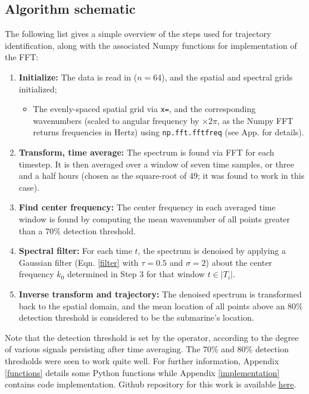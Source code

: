 \documentclass{article}
\begin{document}
\subsection{Algorithm schematic}
The following list gives a simple overview of the steps used for trajectory identification, along with the associated Numpy functions for implementation of the FFT:
\begin{enumerate}
\item \textbf{Initialize:} The data is read in ($n=64$), and the spatial and spectral grids initialized;
  \begin{itemize}
  \item The evenly-spaced spatial grid via \texttt{x=}, and the corresponding wavenumbers (scaled to angular frequency by $\times 2\pi$, as the Numpy FFT returns frequencies in Hertz) using \texttt{np.fft.fftfreq} (see App.  for details).
  \end{itemize}
\item \textbf{Transform, time average:} The spectrum is found via FFT for each timestep. It is then averaged over a window of seven time samples, or three and a half hours (chosen as the square-root of 49; it was found to work in this case).
\item \textbf{Find center frequency:} The center frequency in each averaged time window is found by computing the mean wavenumber of all points greater than a $70\%$ detection threshold.
\item \textbf{Spectral filter:} For each time $t$, the spectrum is denoised by applying a Gaussian filter (Eqn. \ref{filter} with $\tau = 0.5$ and $\sigma=2$) about the center frequency $k_{0}$ determined in Step 3 for that window $t\in|T_i|$.
\item \textbf{Inverse transform and trajectory:} The denoised spectrum is transformed back to the spatial domain, and the mean location of all points above an $80\%$ detection threshold is considered to be the submarine's location.
\end{enumerate}
Note that the detection threshold is set by the operator, according to the degree of various signals persisting after time averaging. The $70\%$ and $80\%$ detection thresholds were seen to work quite well. For further information, Appendix \ref{functions} details some Python functions while Appendix \ref{implementation} contains code implementation. Github repository for this work is available \href{https://github.com/crewsdw/amath582}{here}.
\end{document}
